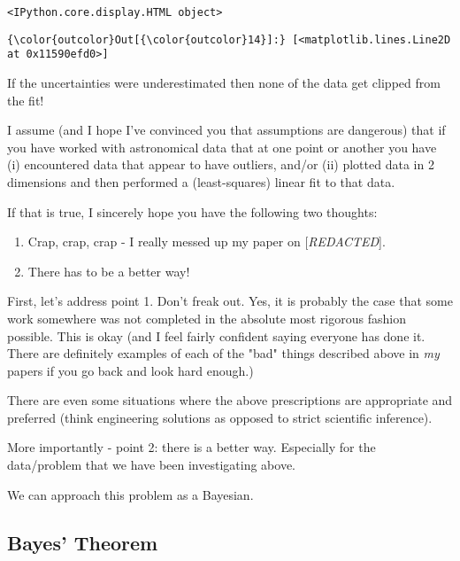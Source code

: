 \documentclass[11pt]{article}
\providecommand{\tightlist}{%
      \setlength{\itemsep}{0pt}\setlength{\parskip}{0pt}}
\begin{document}
    \begin{verbatim}
<IPython.core.display.HTML object>
    \end{verbatim}

    
\begin{Verbatim}[commandchars=\\\{\}]
{\color{outcolor}Out[{\color{outcolor}14}]:} [<matplotlib.lines.Line2D at 0x11590efd0>]
\end{Verbatim}
            
    If the uncertainties were underestimated then none of the data get
clipped from the fit!

    I assume (and I hope I've convinced you that assumptions are dangerous)
that if you have worked with astronomical data that at one point or
another you have (i) encountered data that appear to have outliers,
and/or (ii) plotted data in 2 dimensions and then performed a
(least-squares) linear fit to that data.

    If that is true, I sincerely hope you have the following two thoughts:

\begin{enumerate}
\def\labelenumi{\arabic{enumi}.}
\tightlist
\item
  Crap, crap, crap - I really messed up my paper on
  {[}\emph{REDACTED}{]}.
\item
  There has to be a better way!
\end{enumerate}

    First, let's address point 1. Don't freak out. Yes, it is probably the
case that some work somewhere was not completed in the absolute most
rigorous fashion possible. This is okay (and I feel fairly confident
saying everyone has done it. There are definitely examples of each of
the "bad" things described above in \emph{my} papers if you go back and
look hard enough.)

There are even some situations where the above prescriptions are
appropriate and preferred (think engineering solutions as opposed to
strict scientific inference).

    More importantly - point 2: there is a better way. Especially for the
data/problem that we have been investigating above.

We can approach this problem as a Bayesian.

    \subsection{Bayes' Theorem}\label{bayes-theorem}
\end{document}
